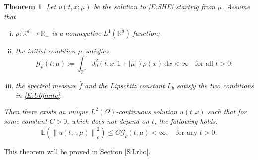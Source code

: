 \documentclass[12pt]{report}
\theoremstyle{plain}
\newtheorem{theorem}{Theorem}[section]
\theoremstyle{definition}
\numberwithin{equation}{section}
\newcommand{\R}{\mathbb{R}}
\newcommand{\E}{\mathbb{E}}
\newcommand{\Norm}[1]{\left\|  #1   \right\|}
\newcommand{\ud}{\ensuremath{ \mathrm{d} }}
\begin{document}
\begin{theorem} \label{T:Lrho}
	Let $u(t,x;\mu)$ be the solution to \eqref{E:SHE} starting from $\mu$. Assume that
	\begin{enumerate}[(i)]
		\item $\rho: \R^d \to \R_+$ is a nonnegative $L^1(\R^d)$ function;
		\item the initial condition $\mu$ satisfies
		\begin{equation} \label{E:G}
		\mathcal{G}_{\rho}(t;\mu)
		:= \int_{\R^d} J_0^2\left(t,x;1+|\mu|\right) \rho(x)\: \ud x< \infty
		\quad \text{for all $t>0$};
		\end{equation}
		\item the spectral measure $\widehat{f}$ and the Lipschitz constant $L_b$ satisfy the two
		conditions in \eqref{E:U0finite}.
	\end{enumerate}
	Then there exists an unique $L^2(\Omega)$-continuous solution $u(t,x)$ such that for some constant
	$C>0$, which does not depend on $t$, the following holds:
	\begin{equation} \label{E:uInLrho}
	\E\left(\Norm{u(t,\cdot;\mu)}_{\rho}^2\right)
	\le C \mathcal{G}_{\rho}(t;\mu)
	< \infty, \quad \text{for any } t > 0. 
	\end{equation}
\end{theorem}

This theorem will be proved in Section \ref{S:Lrho}.
\end{document}
